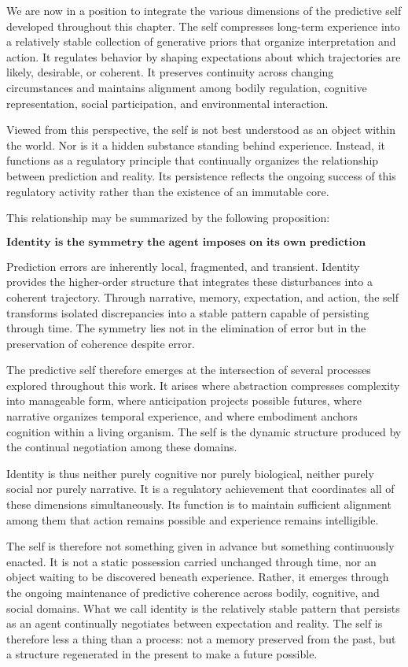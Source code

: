 \documentclass[12pt,letterpaper]{article}
\theoremstyle{remark}
\begin{document}
We are now in a position to integrate the various dimensions of the predictive self developed throughout this chapter. The self compresses long-term experience into a relatively stable collection of generative priors that organize interpretation and action. It regulates behavior by shaping expectations about which trajectories are likely, desirable, or coherent. It preserves continuity across changing circumstances and maintains alignment among bodily regulation, cognitive representation, social participation, and environmental interaction.

Viewed from this perspective, the self is not best understood as an object within the world. Nor is it a hidden substance standing behind experience. Instead, it functions as a regulatory principle that continually organizes the relationship between prediction and reality. Its persistence reflects the ongoing success of this regulatory activity rather than the existence of an immutable core.

This relationship may be summarized by the following proposition:

\[
\textbf{Identity is the symmetry the agent imposes on its own prediction errors.}
\]

Prediction errors are inherently local, fragmented, and transient. Identity provides the higher-order structure that integrates these disturbances into a coherent trajectory. Through narrative, memory, expectation, and action, the self transforms isolated discrepancies into a stable pattern capable of persisting through time. The symmetry lies not in the elimination of error but in the preservation of coherence despite error.

The predictive self therefore emerges at the intersection of several processes explored throughout this work. It arises where abstraction compresses complexity into manageable form, where anticipation projects possible futures, where narrative organizes temporal experience, and where embodiment anchors cognition within a living organism. The self is the dynamic structure produced by the continual negotiation among these domains.

Identity is thus neither purely cognitive nor purely biological, neither purely social nor purely narrative. It is a regulatory achievement that coordinates all of these dimensions simultaneously. Its function is to maintain sufficient alignment among them that action remains possible and experience remains intelligible.

The self is therefore not something given in advance but something continuously enacted. It is not a static possession carried unchanged through time, nor an object waiting to be discovered beneath experience. Rather, it emerges through the ongoing maintenance of predictive coherence across bodily, cognitive, and social domains. What we call identity is the relatively stable pattern that persists as an agent continually negotiates between expectation and reality. The self is therefore less a thing than a process: not a memory preserved from the past, but a structure regenerated in the present to make a future possible.
\end{document}
